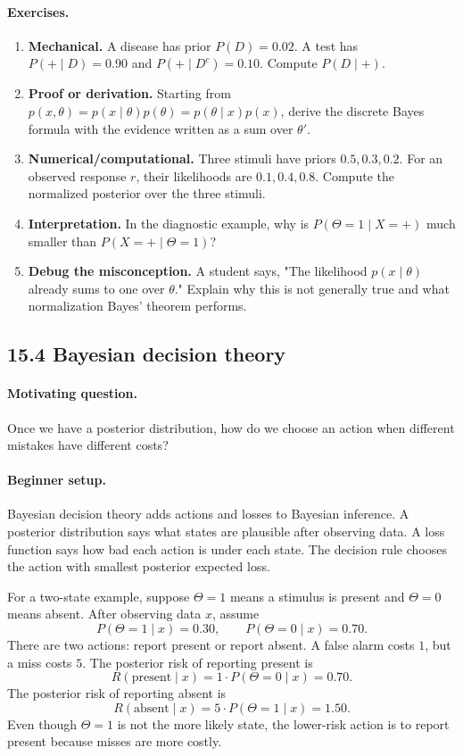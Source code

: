 \paragraph{Exercises.}
\begin{enumerate}[label=\textbf{15.3.\arabic*.}, leftmargin=*]
\item \textbf{Mechanical.} A disease has prior \(P(D)=0.02\). A test has \(P(+\mid D)=0.90\) and \(P(+\mid D^c)=0.10\). Compute \(P(D\mid +)\).
\item \textbf{Proof or derivation.} Starting from \(p(x,\theta)=p(x\mid\theta)p(\theta)=p(\theta\mid x)p(x)\), derive the discrete Bayes formula with the evidence written as a sum over \(\theta'\).
\item \textbf{Numerical/computational.} Three stimuli have priors \(0.5,0.3,0.2\). For an observed response \(r\), their likelihoods are \(0.1,0.4,0.8\). Compute the normalized posterior over the three stimuli.
\item \textbf{Interpretation.} In the diagnostic example, why is \(P(\Theta=1\mid X=+)\) much smaller than \(P(X=+\mid \Theta=1)\)?
\item \textbf{Debug the misconception.} A student says, "The likelihood \(p(x\mid\theta)\) already sums to one over \(\theta\)." Explain why this is not generally true and what normalization Bayes' theorem performs.
\end{enumerate}

\subsection{15.4 Bayesian decision theory}

\paragraph{Motivating question.}
Once we have a posterior distribution, how do we choose an action when different mistakes have different costs?

\paragraph{Beginner setup.}
Bayesian decision theory adds actions and losses to Bayesian inference. A posterior distribution says what states are plausible after observing data. A loss function says how bad each action is under each state. The decision rule chooses the action with smallest posterior expected loss.

For a two-state example, suppose \(\Theta=1\) means a stimulus is present and \(\Theta=0\) means absent. After observing data \(x\), assume
\[
P(\Theta=1\mid x)=0.30,\qquad P(\Theta=0\mid x)=0.70.
\]
There are two actions: report present or report absent. A false alarm costs \(1\), but a miss costs \(5\). The posterior risk of reporting present is
\[
R(\mathrm{present}\mid x)=1\cdot P(\Theta=0\mid x)=0.70.
\]
The posterior risk of reporting absent is
\[
R(\mathrm{absent}\mid x)=5\cdot P(\Theta=1\mid x)=1.50.
\]
Even though \(\Theta=1\) is not the more likely state, the lower-risk action is to report present because misses are more costly.

